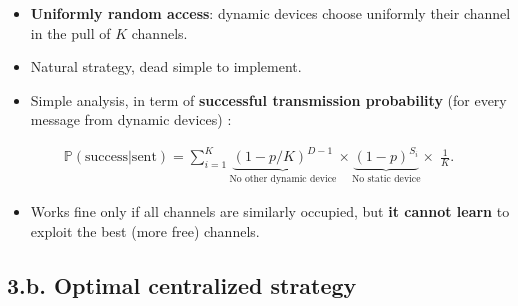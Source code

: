 \begin{frameO}

    \begin{itemize}\tightlist
        \item
              \textbf{Uniformly random access}: dynamic devices choose uniformly
              their channel in the pull of \(K\) channels.
        \item
              Natural strategy, dead simple to implement.
    \end{itemize}

    \pause

    \begin{itemize}\tightlist
        \item
              Simple analysis, in term of \textbf{successful transmission
                  probability} (for every message from dynamic devices) :
    \end{itemize}

    \begin{small} \begin{align*}
            \mathbb{P}(\text{success}|\text{sent}) = \sum_{i=1}^{K} \underbrace{(1 - p / K)^{D-1}}_{\text{No other dynamic device}} \times \underbrace{(1-p)^{S_i}}_{\text{No static device}} \times\; \frac{1}{K}.
        \end{align*} \end{small}

    \pause

    \begin{itemize}\tightlist
        \item
              Works fine only if all channels are similarly occupied,\newline
              but \textbf{it cannot learn} to exploit the best (more free)
              channels.
    \end{itemize}

\end{frameO}



\subsection{\hfill{}3.b. Optimal centralized strategy\hfill{}}

